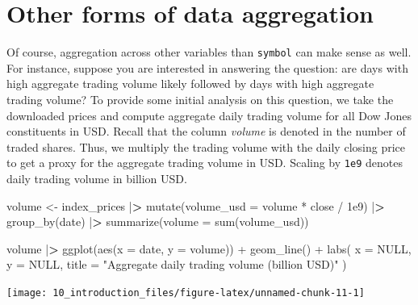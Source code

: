 \documentclass[
]{book}
\newenvironment{Shaded}{\begin{snugshade}}{\end{snugshade}}
\newcommand{\AttributeTok}[1]{\textcolor[rgb]{0.61,0.61,0.61}{#1}}
\newcommand{\ConstantTok}[1]{\textcolor[rgb]{0,0,0}{#1}}
\newcommand{\ErrorTok}[1]{\textcolor[rgb]{0.14,0.14,0.14}{\textbf{#1}}}
\newcommand{\FloatTok}[1]{\textcolor[rgb]{0.06,0.06,0.06}{#1}}
\newcommand{\FunctionTok}[1]{\textcolor[rgb]{0,0,0}{#1}}
\newcommand{\NormalTok}[1]{#1}
\newcommand{\OtherTok}[1]{\textcolor[rgb]{0.37,0.37,0.37}{#1}}
\newcommand{\SpecialCharTok}[1]{\textcolor[rgb]{0,0,0}{#1}}
\newcommand{\StringTok}[1]{\textcolor[rgb]{0.5,0.5,0.5}{#1}}
\begin{document}
\hypertarget{other-forms-of-data-aggregation}{%
\section{Other forms of data aggregation}\label{other-forms-of-data-aggregation}}

Of course, aggregation across other variables than \texttt{symbol} can make sense as well. For instance, suppose you are interested in answering the question: are days with high aggregate trading volume likely followed by days with high aggregate trading volume? To provide some initial analysis on this question, we take the downloaded prices and compute aggregate daily trading volume for all Dow Jones constituents in USD. Recall that the column \emph{volume} is denoted in the number of traded shares. Thus, we multiply the trading volume with the daily closing price to get a proxy for the aggregate trading volume in USD. Scaling by \texttt{1e9} denotes daily trading volume in billion USD.

\begin{Shaded}
\begin{Highlighting}[]
\NormalTok{volume }\OtherTok{\textless{}{-}}\NormalTok{ index\_prices }\SpecialCharTok{|}\ErrorTok{\textgreater{}}
  \FunctionTok{mutate}\NormalTok{(}\AttributeTok{volume\_usd =}\NormalTok{ volume }\SpecialCharTok{*}\NormalTok{ close }\SpecialCharTok{/} \FloatTok{1e9}\NormalTok{) }\SpecialCharTok{|}\ErrorTok{\textgreater{}}
  \FunctionTok{group\_by}\NormalTok{(date) }\SpecialCharTok{|}\ErrorTok{\textgreater{}}
  \FunctionTok{summarize}\NormalTok{(}\AttributeTok{volume =} \FunctionTok{sum}\NormalTok{(volume\_usd))}

\NormalTok{volume }\SpecialCharTok{|}\ErrorTok{\textgreater{}}
  \FunctionTok{ggplot}\NormalTok{(}\FunctionTok{aes}\NormalTok{(}\AttributeTok{x =}\NormalTok{ date, }\AttributeTok{y =}\NormalTok{ volume)) }\SpecialCharTok{+}
  \FunctionTok{geom\_line}\NormalTok{() }\SpecialCharTok{+}
  \FunctionTok{labs}\NormalTok{(}
    \AttributeTok{x =} \ConstantTok{NULL}\NormalTok{, }\AttributeTok{y =} \ConstantTok{NULL}\NormalTok{,}
    \AttributeTok{title =} \StringTok{"Aggregate daily trading volume (billion USD)"}
\NormalTok{  )}
\end{Highlighting}
\end{Shaded}

\begin{center}\texttt{[image: 10\_introduction\_files/figure-latex/unnamed-chunk-11-1]} \end{center}
\end{document}
